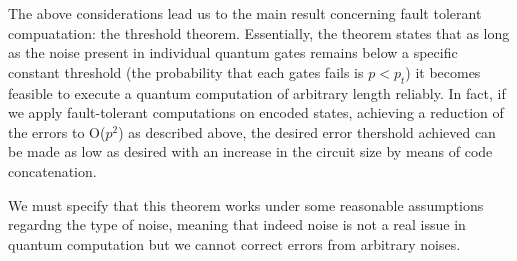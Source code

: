 \documentclass[12pt]{report}
\begin{document}
\begin{minipage}{1 \textwidth}
		
	
        
	    The above considerations lead us to the main result concerning fault tolerant compuatation: the threshold theorem. Essentially, the theorem states that as long as the noise present in individual quantum gates remains below a specific constant threshold (the probability that each gates fails is $p<p_t$) it becomes feasible to execute a quantum computation of arbitrary length reliably. In fact, if we apply fault-tolerant computations on encoded states, achieving a reduction of the errors to O($p^2$) as described above, the desired error thershold achieved can be made as low as desired with an increase in the circuit size by means of code concatenation.\newline
	    
		
		
		
	\end{minipage}
	
	\begin{minipage}{1 \textwidth}
		
		We must specify that this theorem works under some reasonable assumptions regardng the type of noise, meaning that indeed noise is not a real issue in quantum computation but we cannot correct errors from arbitrary noises.
		
	\end{minipage}
	
	\begin{minipage}{1 \textwidth}
		
	\end{minipage}
	


 
	
\end{document}
